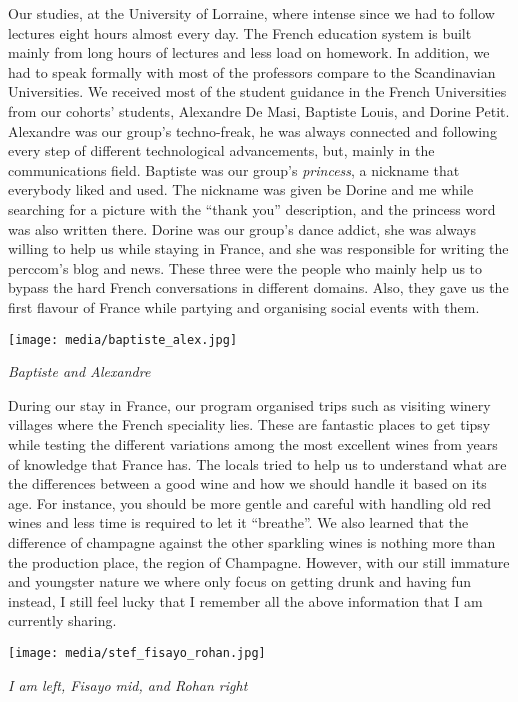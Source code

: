 \documentclass[10pt,a4paper]{article} %
\begin{document}
\begin{multicols}{3}
Our studies, at the University of Lorraine, where intense since we had to 
follow lectures eight hours almost every day. 
The French education system is built mainly from long hours of lectures and less 
load on homework. 
In addition, we had to speak formally with most of the professors compare to the 
Scandinavian Universities. 
We received most of the student guidance in the French Universities from our 
cohorts' students, Alexandre De Masi, Baptiste Louis, and Dorine Petit. 
Alexandre was our group's techno-freak, he was always connected and following 
every step of different technological advancements, but, mainly in the communications 
field. 
Baptiste was our group's \textit{princess}, a nickname that everybody liked and used. 
The nickname was given be Dorine and me while searching for a picture with the ``thank 
you'' description, and the princess word was also written there. 
Dorine was our group's dance addict, she was always willing to help us while 
staying in France, and she was responsible for writing the {\sc perccom}'s blog and 
news.
These three were the people who mainly help us to bypass the hard French conversations 
in different domains. 
Also, they gave us the first flavour of France while partying and organising 
social events with them. 


\begin{center}
	\texttt{[image: media/baptiste\_alex.jpg]}
	\par\textit{Baptiste and Alexandre}
\end{center} 

During our stay in France, our program organised trips such as visiting winery 
villages where the French speciality lies. 
These are fantastic places to get tipsy while testing the different variations 
among the most excellent wines from years of knowledge that France has. 
The locals tried to help us to understand what are the differences between
a good wine and how we should handle it based on its age. 
For instance, you should be more gentle and careful with handling old red wines
and less time is required to let it ``breathe''. 
We also learned that the difference of champagne against the other sparkling wines 
is nothing more than the production place, the region of Champagne. 
However, with our still immature and youngster nature we where only focus on getting 
drunk and having fun instead, I still feel lucky that I remember all the above 
information that I am currently sharing. 

\begin{center}
	\texttt{[image: media/stef\_fisayo\_rohan.jpg]}
	\par\textit{I am left, Fisayo mid, and Rohan right}
\end{center}


\end{multicols}
\end{document}
